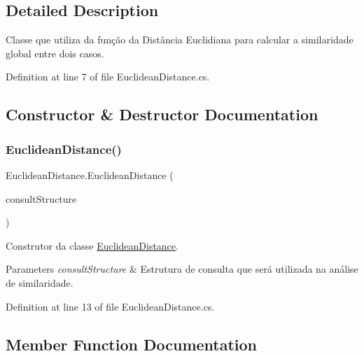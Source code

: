 \subsection{Detailed Description}
Classe que utiliza da função da Distância Euclidiana para calcular a similaridade global entre dois casos. 



Definition at line 7 of file Euclidean\+Distance.\+cs.



\subsection{Constructor \& Destructor Documentation}
\hypertarget{class_euclidean_distance_aaa6a56ca6465502e28906a0c6b89318c}{}\label{class_euclidean_distance_aaa6a56ca6465502e28906a0c6b89318c} 
\subsubsection{\texorpdfstring{Euclidean\+Distance()}{EuclideanDistance()}}
{\footnotesize\ttfamily Euclidean\+Distance.\+Euclidean\+Distance (\begin{DoxyParamCaption}\item[{\hyperlink{class_consult_structure}{Consult\+Structure}}]{consult\+Structure }\end{DoxyParamCaption})}



Construtor da classe \hyperlink{class_euclidean_distance}{Euclidean\+Distance}. 


\begin{DoxyParams}{Parameters}
{\em consult\+Structure} & Estrutura de consulta que será utilizada na análise de similaridade.\\
\hline
\end{DoxyParams}


Definition at line 13 of file Euclidean\+Distance.\+cs.



\subsection{Member Function Documentation}
\hypertarget{class_euclidean_distance_a1b27b1fd06df3e3defca37187634951e}{}\label{class_euclidean_distance_a1b27b1fd06df3e3defca37187634951e} 
